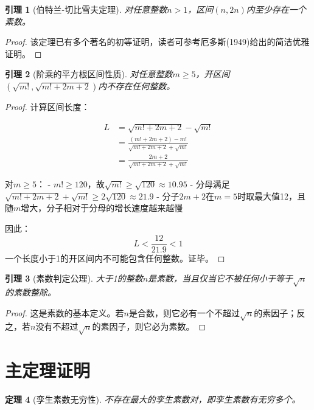 \documentclass[12pt,a4paper,reqno]{amsart}
\theoremstyle{plain}
\newtheorem{theorem}{定理}[section]
\newtheorem{lemma}[theorem]{引理}
\theoremstyle{definition}
\theoremstyle{remark}
\begin{document}
	\begin{lemma}[伯特兰-切比雪夫定理]
		对任意整数$n > 1$，区间$(n, 2n)$内至少存在一个素数。
	\end{lemma}
	
	\begin{proof}
		该定理已有多个著名的初等证明，读者可参考厄多斯(1949)给出的简洁优雅证明。
	\end{proof}
	
	\begin{lemma}[阶乘的平方根区间性质]
		对任意整数$m \ge 5$，开区间$(\sqrt{m!}, \sqrt{m!+2m+2})$内不存在任何整数。
	\end{lemma}
	
	\begin{proof}
		计算区间长度：
		
		\begin{align*}
			L &= \sqrt{m!+2m+2} - \sqrt{m!} \\
			&= \frac{(m!+2m+2) - m!}{\sqrt{m!+2m+2} + \sqrt{m!}} \\
			&= \frac{2m+2}{\sqrt{m!+2m+2} + \sqrt{m!}}
		\end{align*}
		
		
		对$m \ge 5$：
		- $m! \ge 120$，故$\sqrt{m!} \ge \sqrt{120} \approx 10.95$
		- 分母满足$\sqrt{m!+2m+2} + \sqrt{m!} \ge 2\sqrt{120} \approx 21.9$
		- 分子$2m+2$在$m=5$时取最大值12，且随$m$增大，分子相对于分母的增长速度越来越慢
		
		因此：
		\[
		L < \frac{12}{21.9} < 1
		\]
		一个长度小于1的开区间内不可能包含任何整数。证毕。
	\end{proof}
	
	\begin{lemma}[素数判定公理]
		大于1的整数$n$是素数，当且仅当它不被任何小于等于$\sqrt{n}$的素数整除。
	\end{lemma}
	
	\begin{proof}
		这是素数的基本定义。若$n$是合数，则它必有一个不超过$\sqrt{n}$的素因子；反之，若$n$没有不超过$\sqrt{n}$的素因子，则它必为素数。
	\end{proof}
	
	\section{主定理证明}
	
	\begin{theorem}[孪生素数无穷性]
		不存在最大的孪生素数对，即孪生素数有无穷多个。
	\end{theorem}
	
\end{document}
